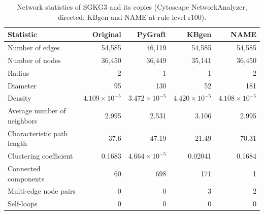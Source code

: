 \begin{table}[t]
\centering
\caption{Network statistics of SGKG3 and its copies (Cytoscape NetworkAnalyzer, directed; KBgen and NAME at rule level r100).}
\label{tab:cytoscape_SGKG3}
\begin{tabular}{lrrrr}
\toprule
Statistic & Original & PyGraft & KBgen & NAME \\
\midrule
Number of edges & 54{,}585 & 46{,}119 & 54{,}585 & 54{,}585 \\
Number of nodes & 36{,}450 & 36{,}449 & 35{,}141 & 36{,}450 \\
Radius & 2 & 1 & 1 & 2 \\
Diameter & 95 & 130 & 52 & 181 \\
Density & $4.109\times10^{-5}$ & $3.472\times10^{-5}$ & $4.420\times10^{-5}$ & $4.108\times10^{-5}$ \\
Average number of neighbors & 2.995 & 2.531 & 3.106 & 2.995 \\
Characteristic path length & 37.6 & 47.19 & 21.49 & 70.31 \\
Clustering coefficient & 0.1683 & $4.664\times10^{-5}$ & 0.02041 & 0.1684 \\
Connected components & 60 & 698 & 171 & 1 \\
Multi-edge node pairs & 0 & 0 & 3 & 2 \\
Self-loops & 0 & 0 & 0 & 0 \\
\bottomrule
\end{tabular}
\end{table}
